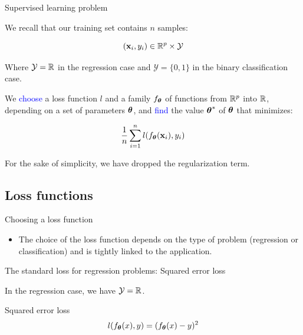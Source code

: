 \documentclass[xcolor=pdftex,dvipsnames,table,mathserif]{beamer}
\begin{document}
\begin{frame}{Supervised learning problem}

  We recall that our training set contains $n$ samples:

  \[
  (\mathbf{x}_i, y_i) \in \mathbb{R}^p \times \mathcal{Y}
  \]

  Where $\mathcal{Y}=\mathbb{R}$ in the regression case and $\mathcal{Y}=\{0, 1\}$ in the binary classification case.

  \pause

  We \textcolor{blue}{choose} a loss function $l$ and a family $f_{\boldsymbol{\theta}}$
  of functions from $\mathbb{R}^p$ into $\mathbb{R}$,
  depending on a set of parameters $\boldsymbol{\theta}$,
  and \textcolor{blue}{find} the value $\boldsymbol{\theta} ^{\ast}$ of $\boldsymbol{\theta}$
  that minimizes:

  \[
  \frac{1}{n} \sum\limits_{i=1}^{n}   l (f_{\boldsymbol{\theta}}(\mathbf{x}_i), y_i)
  \]

  \vspace{1em}

  \pause

  \small{For the sake of simplicity, we have dropped the regularization term.}

\end{frame}


\subsection{Loss functions}


\begin{frame}{Choosing a loss function}

\begin{itemize}
\item The choice of the loss function depends on the type of problem (regression or classification) and is tightly linked to the application.
\end{itemize}

\end{frame}


\begin{frame}{The standard loss for regression problems: Squared error loss}

In the regression case, we have $\mathcal{Y} = \mathbb{R}$.

\begin{block}{Squared error loss}
    \[
    l(f_{\boldsymbol{\theta}}(x), y) = (f_{\boldsymbol{\theta}}(x) - y)^2
    \]

\end{block}

\end{frame}
\end{document}
